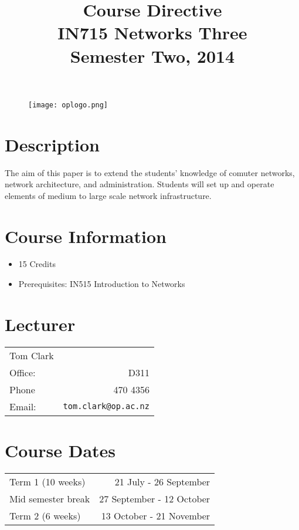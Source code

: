 \documentclass{article}
\begin{document}
\begin{figure}
\texttt{[image: oplogo.png]}
\end{figure}

\title{Course Directive\\IN715 Networks Three\\Semester Two, 2014}
\date{}
\maketitle

\section*{Description}
The aim of this paper is to extend the students' knowledge of comuter networks, network architecture, and administration. Students will set up and operate elements of medium to large scale network infrastructure.

\section*{Course Information}
\begin{itemize}
  \item 15 Credits
  \item Prerequisites: IN515 Introduction to Networks
\end{itemize}

\section*{Lecturer}
\begin{tabular}{lr}

  Tom Clark &    \\
     Office: & D311 \\
     Phone & 470 4356 \\
     Email: & \texttt{tom.clark@op.ac.nz} \\
\end{tabular}

\section*{Course Dates}
\begin{tabular}{lr}
Term 1 (10 weeks) & 21 July - 26 September \\
Mid semester break & 27 September - 12 October \\
Term 2 (6 weeks) & 13 October - 21 November \\
\end{tabular}
\end{document}
